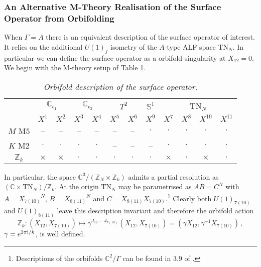 \documentclass[main.tex]{subfiles}
\begin{document}
\subsubsection{An Alternative M-Theory Realisation of the Surface Operator from Orbifolding}
When $\Gamma=A$ there is an equivalent description of the surface operator of interest. It relies on the additional $U(1)_f$ isometry of the $A$-type ALF space TN$_N$. In particular we can define the surface operator as a orbifold singularity at $X_{12}=0$. We begin with the M-theory setup of Table \ref{table:Mtheory2}.
\begin{table}[ht!]
\centering
\begin{tabular}{ c |c| c| c| c| c| c| c| c| c| c| c|}
&\multicolumn{2}{c|}{$\mathbb{C}_{\epsilon_1}$}&\multicolumn{2}{c|}{$\mathbb{C}_{\epsilon_2}$}&\multicolumn{2}{c|}{$T^2$}&$\mathbb{S}^1$&\multicolumn{4}{c|}{TN$_N$}\\
   & $X^1$ & $X^2$ & $X^3$ & $X^4$ & $X^5$ & $X^6$ & $X^9$ & $X^7$ & $X^8$& $X^{10}$&$X^{11}$\\\hline 
 $M$ M$5$ & -- & -- & -- & -- & -- & -- & $\cdot$ & $\cdot$ & $\cdot$ & $\cdot$&$\cdot$\\ \hline
  $K$ M$2$ & $\cdot$ & $\cdot$ & $\cdot$ & $\cdot$ & -- & -- & --&$\cdot$ & $\cdot$  & $\cdot$ & $\cdot$ \\\hline
  $\mathbb{Z}_k$ & $\times$ & $\times$ & $\cdot$ & $\cdot$ & $\cdot$ & $\cdot$ & $\cdot$  & $\times$&$\cdot$ & $\times$ & $\cdot$ \\\hline
\end{tabular}
\caption{\it Orbifold description of the surface operator.}
\label{table:Mtheory2}
\end{table}
In particular, the space $\mathbb{C}^3/(\mathbb{Z}_N\times\mathbb{Z}_k)$ admits a partial resolution as $(\mathbb{C}\times \text{TN}_{N})/\mathbb{Z}_k$. At the origin TN$_N$ may be parametrised as $AB=C^N$ with $A={X_{7(10)}}^N$, $B={X_{8(11)}}^N$ and $C=X_{8(11)}X_{7(10)}$.\footnote{Descriptions of the orbifolds $\mathbb{C}^2/\Gamma$ can be found in 3.9 of \cite{Benvenuti:2006qr}.} Clearly both $U(1)_{7(10)}$ and $U(1)_{8(11)}$ leave this description invariant and therefore the orbifold action
\begin{equation}
\mathbb{Z}_k:(X_{12},X_{7(10)})\mapsto \gamma^{J_{12}-J_{7(10)}}(X_{12},X_{7(10)})=(\gamma X_{12},\gamma^{-1}X_{7(10)})\,,
\end{equation} 
$\gamma=e^{2\pi\mathrm{i}/k}$, is well defined.
\end{document}

